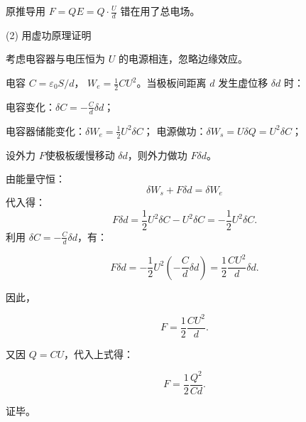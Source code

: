 \documentclass{article}
\begin{document}
原推导用 $ F = QE = Q \cdot \frac{U}{d} $ 错在用了总电场。



(2) 用虚功原理证明 

考虑电容器与电压恒为 $U$ 的电源相连，忽略边缘效应。

电容 $C = \varepsilon_0 S / d$， $W_e = \frac{1}{2} C U^2$。当极板间距离 $d$ 发生虚位移 $\delta d$ 时：  

电容变化：$\delta C = -\frac{C}{d} \delta d$；  

电容器储能变化：$\delta W_e = \frac{1}{2} U^2 \delta C$；  
电源做功：$\delta W_s = U \delta Q = U^2 \delta C$；  

设外力 $F$使极板缓慢移动 $\delta d$，则外力做功 $F \delta d$。  

由能量守恒：  
$$\delta W_s + F \delta d = \delta W_e$$  
代入得：  
$$F \delta d = \frac{1}{2} U^2 \delta C - U^2 \delta C = -\frac{1}{2} U^2 \delta C.$$  
利用 $\delta C = -\frac{C}{d} \delta d$，有：  

$$F \delta d = -\frac{1}{2} U^2 \left( -\frac{C}{d} \delta d \right) = \frac{1}{2} \frac{C U^2}{d} \delta d.$$  

因此，  

$$F = \frac{1}{2} \frac{C U^2}{d}.$$  

又因 $Q = C U$，代入上式得：  

$$F = \frac{1}{2} \frac{Q^2}{C d}.$$  

证毕。
\end{document}
